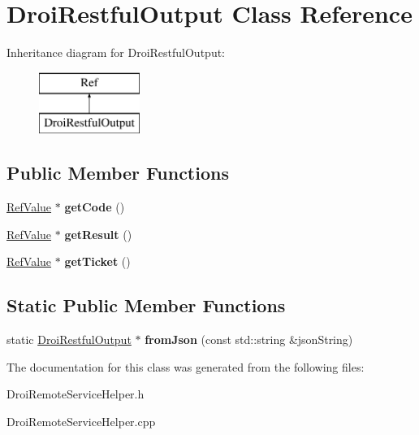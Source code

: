 \hypertarget{class_droi_restful_output}{}\section{Droi\+Restful\+Output Class Reference}
\label{class_droi_restful_output}
Inheritance diagram for Droi\+Restful\+Output\+:\begin{figure}[H]
\begin{center}
\leavevmode
\includegraphics[height=2.000000cm]{d6/da7/class_droi_restful_output}
\end{center}
\end{figure}
\subsection*{Public Member Functions}
\begin{DoxyCompactItemize}
\item 
\mbox{\label{class_droi_restful_output_a4454ce39ca7b8c34e11e1713ec6e3466}} 
\hyperlink{class_ref_value}{Ref\+Value} $\ast$ {\bfseries get\+Code} ()
\item 
\mbox{\label{class_droi_restful_output_a9dc13ad3743824eabd0f5102e186a30a}} 
\hyperlink{class_ref_value}{Ref\+Value} $\ast$ {\bfseries get\+Result} ()
\item 
\mbox{\label{class_droi_restful_output_ad963107e7ab36ecf7faf560f08975546}} 
\hyperlink{class_ref_value}{Ref\+Value} $\ast$ {\bfseries get\+Ticket} ()
\end{DoxyCompactItemize}
\subsection*{Static Public Member Functions}
\begin{DoxyCompactItemize}
\item 
\mbox{\label{class_droi_restful_output_ab368eacd43161ef5c47676e1d72bf306}} 
static \hyperlink{class_droi_restful_output}{Droi\+Restful\+Output} $\ast$ {\bfseries from\+Json} (const std\+::string \&json\+String)
\end{DoxyCompactItemize}


The documentation for this class was generated from the following files\+:\begin{DoxyCompactItemize}
\item 
Droi\+Remote\+Service\+Helper.\+h\item 
Droi\+Remote\+Service\+Helper.\+cpp\end{DoxyCompactItemize}
